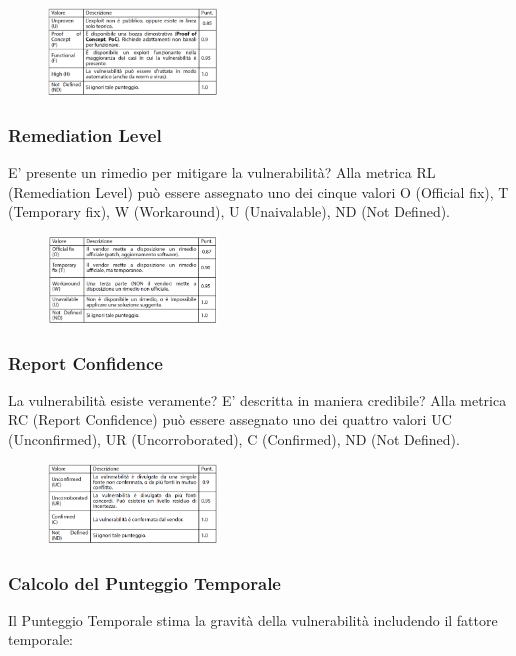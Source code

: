 \begin{figure}[hbpt!]
    \centering
    \includegraphics[width=0.4\textwidth]{./Images/cap2/2.15.png}
\end{figure}
\FloatBarrier

\subsubsection{Remediation Level}
E’ presente un rimedio per
mitigare la vulnerabilità? Alla metrica RL (Remediation Level) può essere assegnato uno
dei cinque valori O (Official fix), T (Temporary fix),
W (Workaround), U (Unaivalable), ND (Not Defined).

\begin{figure}[hbpt!]
    \centering
    \includegraphics[width=0.4\textwidth]{./Images/cap2/2.16.png}
\end{figure}
\FloatBarrier

\subsubsection{Report Confidence}
La vulnerabilità esiste veramente?
E’ descritta in maniera credibile? Alla metrica RC (Report Confidence) può essere assegnato uno
dei quattro valori UC (Unconfirmed), UR (Uncorroborated),
C (Confirmed), ND (Not Defined).

\begin{figure}[hbpt!]
    \centering
    \includegraphics[width=0.4\textwidth]{./Images/cap2/2.17.png}
\end{figure}
\FloatBarrier

\subsubsection{Calcolo del Punteggio Temporale}
Il Punteggio Temporale stima la gravità della
vulnerabilità includendo il fattore temporale:

